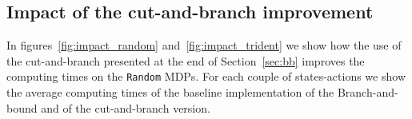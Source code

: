 
 






\subsection{Impact of the cut-and-branch improvement}

In figures~\ref{fig:impact_random} and~\ref{fig:impact_trident} we show how the use of the cut-and-branch presented at the end of Section~\ref{sec:bb} improves the computing times on the \texttt{Random} MDPs.
For each couple of states-actions we show the average computing times of the baseline implementation of the Branch-and-bound and of the cut-and-branch version.

